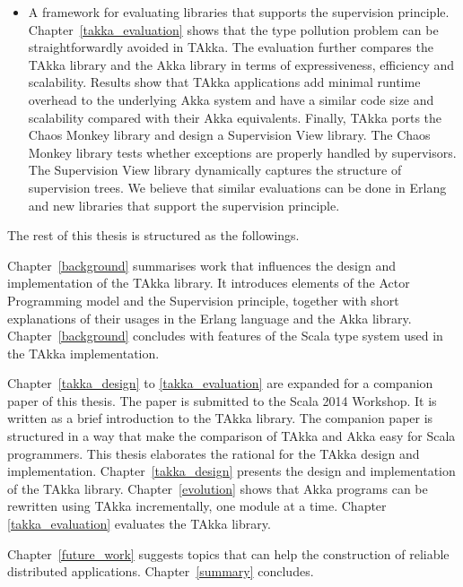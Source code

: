 \begin{itemize}
  
  \item A framework for evaluating libraries that supports the supervision 
  principle. Chapter~\ref{takka_evaluation} shows that the type pollution 
  problem can be straightforwardly avoided in TAkka.  The evaluation further 
  compares the TAkka library and the Akka library in terms of expressiveness, efficiency and 
  scalability. Results show that TAkka applications add minimal runtime overhead 
  to the underlying Akka system and have a similar code size and scalability 
  compared with their Akka equivalents. Finally, TAkka ports the Chaos Monkey 
  library and design a Supervision View library.  The Chaos Monkey library tests whether 
  exceptions are properly handled by supervisors.  The Supervision View library 
  dynamically captures the structure of supervision trees. We believe that similar 
  evaluations can be done in Erlang and new libraries that support the supervision 
  principle.
\begin{comment}  
  \item A model for analyzing the reliability and availability of 
  fault-tolerant systems that use the {\it reactive} mechanism (supervision) 
  and the {\it proactive} mechanism (software rejuvenation).  The novel model 
  (Chapter~\ref{rejuvenation_model}) overcomes the limitation of the classic 
  software rejuvenation model where the failure rate is treated as a constant
  and failure recovery is ironically treated as a stochastic process.  
  \mycomment{add new contributions once achieved}
  \mycomment{efficient approximate estimation}
  \mycomment{? the classic model is the least accurate approximation. ?}  
\end{comment}  
\end{itemize}


The rest of this thesis is structured as the followings.

Chapter~\ref{background} summarises work that influences the design and implementation
of the TAkka library.  It introduces elements of the Actor Programming model and the 
Supervision principle, together with short explanations of their usages in the Erlang 
language and the Akka library.  Chapter~\ref{background} concludes with features of the
Scala type system used in the TAkka implementation.   

Chapter~\ref{takka_design} to \ref{takka_evaluation}
are expanded for a companion paper of this thesis.  The paper is submitted to the Scala 2014
Workshop.  It is written as a brief introduction to the TAkka library.  The companion paper
is structured in a way that make the comparison of TAkka and Akka easy for Scala programmers.
This thesis elaborates the rational for the TAkka design and implementation.   
Chapter~\ref{takka_design} presents the design and implementation of the TAkka library. 
Chapter~\ref{evolution} shows that Akka programs can be rewritten using TAkka incrementally, 
one module at a time.
Chapter \ref{takka_evaluation} evaluates the TAkka library.

Chapter~\ref{future_work} suggests topics that can help the construction of reliable
distributed applications.  Chapter~\ref{summary} concludes.

